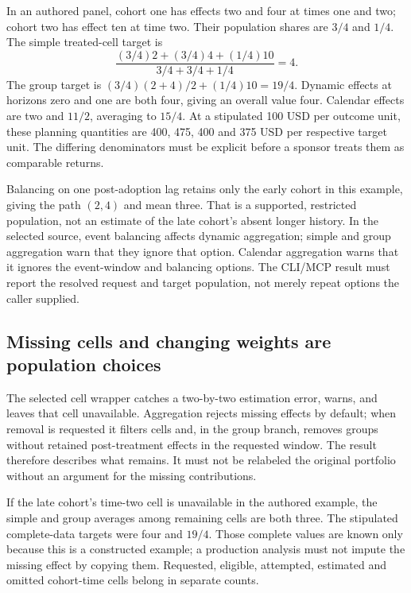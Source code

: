 In an authored panel, cohort one has effects two and four at times one and
two; cohort two has effect ten at time two. Their population shares are
$3/4$ and $1/4$. The simple treated-cell target is
\[
 \frac{(3/4)2+(3/4)4+(1/4)10}{3/4+3/4+1/4}=4.
\]
The group target is $(3/4)(2+4)/2+(1/4)10=19/4$.
Dynamic effects at horizons zero and one are both four, giving an overall
value four. Calendar effects are two and $11/2$, averaging to $15/4$.
At a stipulated 100 USD per outcome unit, these planning quantities are 400,
475, 400 and 375 USD per respective target unit. The differing denominators
must be explicit before a sponsor treats them as comparable returns.
\citep{exec24_panelr_contract}

Balancing on one post-adoption lag retains only the early cohort in this
example, giving the path $(2,4)$ and mean three. That is a supported,
restricted population, not an estimate of the late cohort's absent longer
history. In the selected source, event balancing affects dynamic aggregation;
simple and group aggregation warn that they ignore that option. Calendar
aggregation warns that it ignores the event-window and balancing options.
The CLI/MCP result must report the resolved request and target population,
not merely repeat options the caller supplied.
\citep{exec24_panelr_did,exec24_panelr_contract}

\subsection{Missing cells and changing weights are population choices}
The selected cell wrapper catches a two-by-two estimation error, warns, and
leaves that cell unavailable. Aggregation rejects missing effects by default;
when removal is requested it filters cells and, in the group branch, removes
groups without retained post-treatment effects in the requested window. The
result therefore describes what remains. It must not be relabeled the original
portfolio without an argument for the missing contributions.
\citep{exec24_panelr_did}

If the late cohort's time-two cell is unavailable in the authored example,
the simple and group averages among remaining cells are both three. The
stipulated complete-data targets were four and $19/4$. Those complete values
are known only because this is a constructed example; a production analysis
must not impute the missing effect by copying them. Requested, eligible,
attempted, estimated and omitted cohort-time cells belong in separate counts.
\citep{exec24_panelr_contract}

